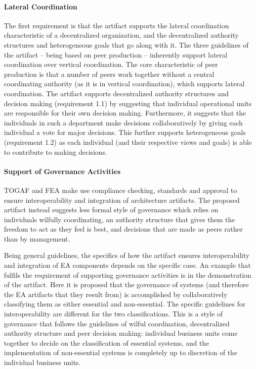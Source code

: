 \paragraph{Lateral Coordination}

The first requirement is that the artifact supports the lateral coordination characteristic of a decentralized organization, and the decentralized authority structures and heterogeneous goals that go along with it. The three guidelines of the artifact -- being based on peer production -- inherently support lateral coordination over vertical coordination. The core characteristic of peer production is that a number of peers work together without a central coordinating authority (as it is in vertical coordination), which supports lateral coordination. The artifact supports decentralized authority structures and decision making (requirement 1.1) by suggesting that individual operational units are responsible for their own decision making. Furthermore, it suggests that the individuals in such a department make decisions collaboratively by giving each individual a vote for major decisions. This further supports heterogeneous goals (requirement 1.2) as each individual (and their respective views and goals) is able to contribute to making decisions.

\paragraph{Support of Governance Activities}

TOGAF and FEA make use compliance checking, standards and approval to ensure interoperability and integration of architecture artifacts. The proposed artifact instead suggests less formal style of governance which relies on individuals wilfully coordinating, an authority structure that gives them the freedom to act as they feel is best, and decisions that are made as peers rather than by management.

Being general guidelines, the specifics of how the artifact ensures interoperability and integration of EA components depends on the specific case. An example that fulfils the requirement of supporting governance activities is in the demonstration of the artifact. Here it is proposed that the governance of systems (and therefore the EA artifacts that they result from) is accomplished by collaboratively classifying them as either essential and non-essential. The specific guidelines for interoperability are different for the two classifications. This is a style of governance that follows the guidelines of wilful coordination, decentralized authority structure and peer decision making: individual business units come together to decide on the classification of essential systems, and the implementation of non-essential systems is completely up to discretion of the individual business units. 

